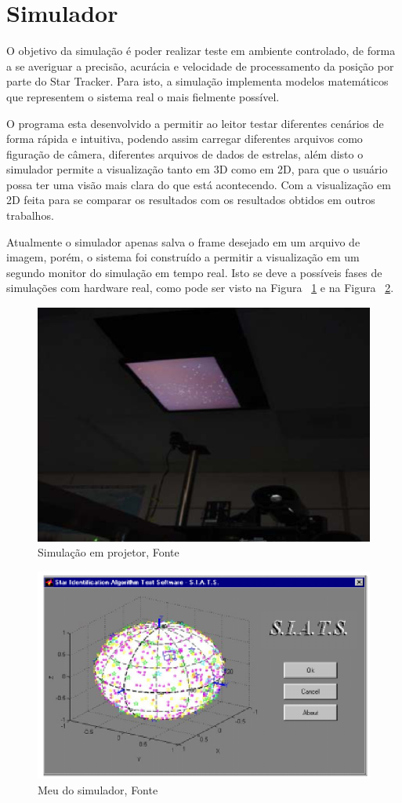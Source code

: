 \section{Simulador}

O objetivo da simulação é poder realizar teste em ambiente controlado, 
de forma a se averiguar a precisão, acurácia e velocidade de processamento da posição por parte do Star Tracker. 
Para isto, a simulação implementa modelos matemáticos que representem o sistema real o mais fielmente possível. 

O programa esta desenvolvido a permitir ao leitor testar diferentes cenários de forma rápida e intuitiva,
podendo assim carregar diferentes arquivos como figuração de câmera, diferentes arquivos de dados de estrelas,
além disto o simulador permite a visualização tanto em 3D como em 2D, para que o usuário possa ter uma visão mais clara do que está acontecendo.
Com a visualização em 2D feita para se comparar os resultados com os resultados obtidos em outros trabalhos.

Atualmente o simulador apenas salva o frame desejado em um arquivo de imagem, porém, o sistema foi construído a permitir a visualização em um segundo monitor do simulação em tempo real.
Isto se deve a possíveis fases de simulações com hardware real, como pode ser visto na Figura ~\ref{fig:Simulador_top} e na Figura ~\ref{fig:Simulador_tipo_meu}.

\begin{figure}[H]
    \centering
    \includegraphics[width=.65\columnwidth]{images/Simulador_top.png}
    \caption{Simulação em projetor, Fonte ~\cite[]{Tappe}}
    \label{fig:Simulador_top}
\end{figure}

\begin{figure}[H]
    \centering
    \includegraphics[width=.65\columnwidth]{images/Simulador_tipo_meu.png}
    \caption{Meu do simulador, Fonte ~\cite[]{Carvalho}}
    \label{fig:Simulador_tipo_meu}
\end{figure}

